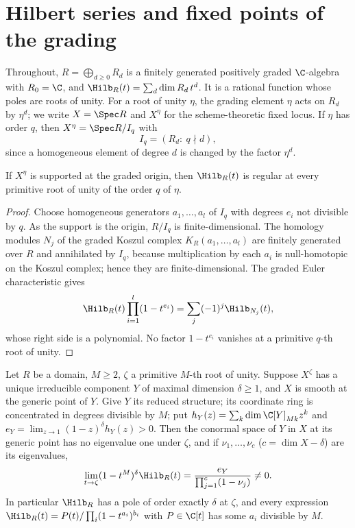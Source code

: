 \section{Hilbert series and fixed points of the grading}\label{sec:hilbert}

Throughout, $R=\bigoplus_{d\ge0}R_d$ is a finitely generated positively graded
$\C$-algebra with $R_0=\C$, and $\Hilb_R(t)=\sum_d\dim R_d\,t^d$. It is a
rational function whose poles are roots of unity. For a root of unity $\eta$,
the grading element $\eta$ acts on $R_d$ by $\eta^d$; we write $X=\Spec R$ and
$X^\eta$ for the scheme-theoretic fixed locus. If $\eta$ has order $q$, then
$X^\eta=\Spec R/I_q$ with
\begin{equation}\label{eq:fixedideal}
 I_q=(R_d:\ q\nmid d),
\end{equation}
since a homogeneous element of degree $d$ is changed by the factor $\eta^d$.

\begin{lemma}\label{lem:isolated}
If $X^\eta$ is supported at the graded origin, then $\Hilb_R(t)$ is regular at
every primitive root of unity of the order $q$ of $\eta$.
\end{lemma}

\begin{proof}
Choose homogeneous generators $a_1,\dots,a_l$ of $I_q$ with degrees $e_i$ not
divisible by $q$. As the support is the origin, $R/I_q$ is finite-dimensional.
The homology modules $N_j$ of the graded Koszul complex $K_R(a_1,\dots,a_l)$
are finitely generated over $R$ and annihilated by $I_q$, because
multiplication by each $a_i$ is null-homotopic on the Koszul complex; hence
they are finite-dimensional. The graded Euler characteristic gives
\[
 \Hilb_R(t)\prod_{i=1}^l(1-t^{e_i})=\sum_j(-1)^j\Hilb_{N_j}(t),
\]
whose right side is a polynomial. No factor $1-t^{e_i}$ vanishes at a
primitive $q$-th root of unity.
\end{proof}

\begin{proposition}\label{prop:fixedcomponentpole}
Let $R$ be a domain, $M\ge2$, $\zeta$ a primitive $M$-th root of unity. Suppose
$X^\zeta$ has a unique irreducible component $Y$ of maximal dimension
$\delta\ge1$, and $X$ is smooth at the generic point of $Y$. Give $Y$ its
reduced structure; its coordinate ring is concentrated in degrees divisible
by $M$; put $h_Y(z)=\sum_k\dim\C[Y]_{Mk}z^k$ and
$e_Y=\lim_{z\to1}(1-z)^\delta h_Y(z)>0$. Then the conormal space of $Y$ in $X$
at its generic point has no eigenvalue one under $\zeta$, and if
$\nu_1,\dots,\nu_c$ ($c=\dim X-\delta$) are its eigenvalues,
\begin{equation}\label{eq:residue}
 \lim_{t\to\zeta}(1-t^M)^\delta\Hilb_R(t)=\frac{e_Y}{\prod_{j=1}^c(1-\nu_j)}\ne0 .
\end{equation}
In particular $\Hilb_R$ has a pole of order exactly $\delta$ at $\zeta$, and
every expression $\Hilb_R(t)=P(t)/\prod_i(1-t^{a_i})^{b_i}$ with $P\in\C[t]$
has some $a_i$ divisible by $M$.
\end{proposition}

